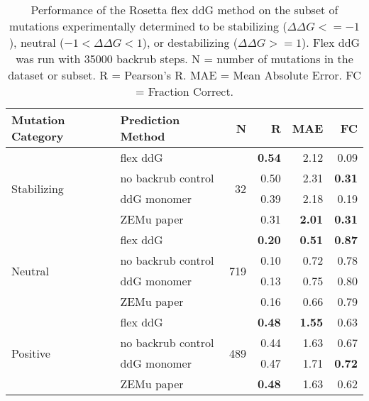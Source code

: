 \begin{table}
  \begin{tabular}{llrrrr}
\toprule
Mutation Category &   Prediction Method &    N &    R &  MAE &   FC \\
\midrule
 \multirow{ 4}{*}{Stabilizing} & flex ddG & \multirow{ 4}{*}{32} & \textbf{0.54} & 2.12 & 0.09  \\
 & no backrub control & & 0.50 & 2.31 & \textbf{0.31}  \\
 & ddG monomer & & 0.39 & 2.18 & 0.19  \\
 & ZEMu paper & & 0.31 & \textbf{2.01} & \textbf{0.31}  \\
\hline
 \multirow{ 4}{*}{Neutral} & flex ddG & \multirow{ 4}{*}{719} & \textbf{0.20} & \textbf{0.51} & \textbf{0.87}  \\
 & no backrub control & & 0.10 & 0.72 & 0.78  \\
 & ddG monomer & & 0.13 & 0.75 & 0.80  \\
 & ZEMu paper & & 0.16 & 0.66 & 0.79  \\
\hline
 \multirow{ 4}{*}{Positive} & flex ddG & \multirow{ 4}{*}{489} & \textbf{0.48} & \textbf{1.55} & 0.63  \\
 & no backrub control & & 0.44 & 1.63 & 0.67  \\
 & ddG monomer & & 0.47 & 1.71 & \textbf{0.72}  \\
 & ZEMu paper & & \textbf{0.48} & 1.63 & 0.62  \\
\bottomrule
\end{tabular}
  \caption[Flex ddG performance on stabilizing mutations]{
    Performance of the Rosetta flex ddG method on the subset of mutations experimentally determined to be stabilizing ($\Delta\Delta G <= -1$), neutral ($-1 < \Delta\Delta G < 1$), or destabilizing ($\Delta\Delta G >= 1$). Flex ddG was run with 35000 backrub steps. N = number of mutations in the dataset or subset. R = Pearson's R. MAE = Mean Absolute Error. FC = Fraction Correct.
  } \label{tab:table-stabilizing}
\end{table}
